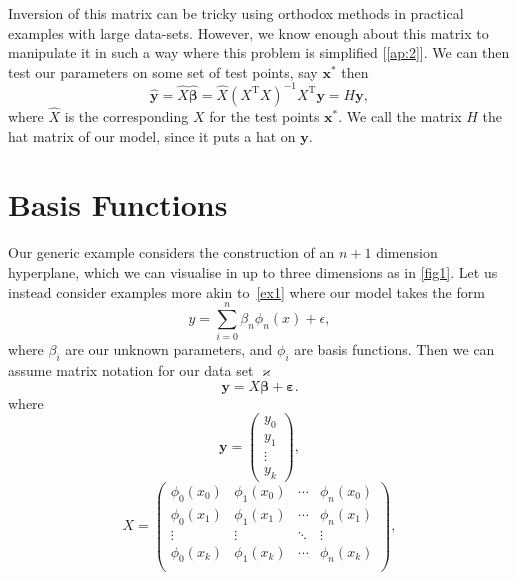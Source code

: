 \documentclass[10pt,a4paper, onecolumn, conference]{IEEEtran}
\theoremstyle{own}
\theoremstyle{definition}
\theoremstyle{plain}
\begin{document}
Inversion of this matrix can be tricky using orthodox methods in practical examples with large data-sets. However, we know enough about this matrix to manipulate it in such a way where this problem is simplified [\ref{ap:2}]. We can then test our parameters on some set of test points, say $\mathbf{x}^{*}$ then
\begin{equation}
\hat{\mathbf{y}} = \hat{X} \hat{\boldsymbol\beta} = \hat{X} (X^{\text{T}} X)^{-1} X^{\text{T}}\mathbf{y} = H\textbf{y},
\end{equation}
where $\hat{X}$ is the corresponding $X$ for the test points $\mathbf{x}^{*}$. We call the matrix $H$ the hat matrix of our model, since it puts a hat on $\mathbf{y}$. 
\section{Basis Functions}
Our generic example considers the construction of an $n+1$ dimension hyperplane, which we can visualise in up to three dimensions as in \cref{fig1}. Let us instead consider examples more akin to~\cref{ex1} where our model takes the form
\begin{equation}
y = \sum_{i = 0}^{n} \beta_n \phi_n(x) + \epsilon,
\end{equation}
where $\beta_i$ are our unknown parameters, and $\phi_i$ are basis functions. Then we can assume matrix notation for our data set $\varkappa$
\begin{equation}
\mathbf{y} = X \boldsymbol\beta + \boldsymbol\varepsilon.
\end{equation}
where
\begin{equation}
\mathbf{y} = \left( \begin{matrix} y_0 \\ y_1 \\ \vdots \\ y_k \end{matrix} \right),
\end{equation}
\begin{equation}
X = \left( \begin{matrix}
\phi_0(x_0) & \phi_1(x_0) & \cdots & \phi_n(x_0) \\
\phi_0(x_1) & \phi_1(x_1) & \cdots & \phi_n(x_1) \\
\vdots & \vdots & \ddots & \vdots \\
\phi_0(x_k) & \phi_1(x_k) & \cdots & \phi_n(x_k) \\
\end{matrix} \right),
\end{equation}
\end{document}
